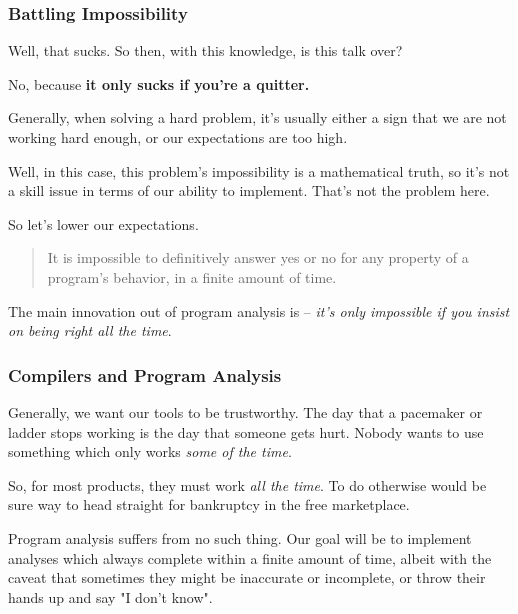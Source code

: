 \documentclass[aspectratio=169, handout]{beamer}
\begin{document}
\begin{frame}[fragile]
  \frametitle{Battling Impossibility}

  Well, that sucks. So then, with this knowledge, is this talk over?

  \pause
  \vspace{\fill}

  No, because \textbf{it only sucks if you're a quitter.}

  \pause
  \vspace{\fill}

  Generally, when solving a hard problem, it's usually either a sign that we
  are not working hard enough, or our expectations are too high.
  \pause
  \vspace{\fill}

  Well, in this case, this problem's impossibility is a mathematical truth, so
  it's not a skill issue in terms of our ability to implement. That's not the
  problem here.

  \pause
  \vspace{\fill}

  So let's lower our expectations.

  \pause
  \vspace{\fill}

  \begin{quote}
    It is impossible to definitively answer yes or no for any property of a
    program's behavior, in a finite amount of time.
  \end{quote}

  \pause
  \vspace{\fill}

  The main innovation out of program analysis is -- \textit{it's only impossible if
  you insist on being right all the time}.
\end{frame}

\begin{frame}[fragile]
  \frametitle{Compilers and Program Analysis}

  Generally, we want our tools to be trustworthy. The day that a pacemaker or
  ladder stops working is the day that someone gets hurt. Nobody wants to use
  something which only works \textit{some of the time}.

  \pause
  \vspace{\fill}

  So, for most products, they must work \textit{all the time}. To do otherwise
  would be sure way to head straight for bankruptcy in the free
  marketplace.

  \pause
  \vspace{\fill}

  Program analysis suffers from no such thing. Our goal will be to implement
  analyses which always complete within a finite amount of time, albeit with
  the caveat that sometimes they might be inaccurate or incomplete, or throw their
  hands up and say "I don't know".
\end{frame}
\end{document}

